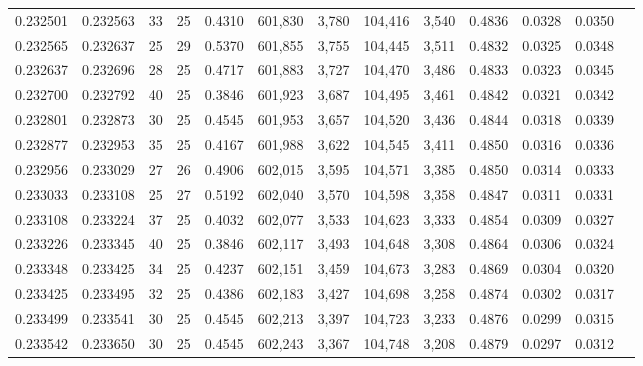 \begin{tabular}{rrrrrrrrrrrrr}
0.232501 & 0.232563 &  33 &  25 &                                     0.4310 & 601,830 &   3,780 & 104,416 &   3,540 & 0.4836 & 0.0328 & 0.0350 \\
0.232565 & 0.232637 &  25 &  29 &                                     0.5370 & 601,855 &   3,755 & 104,445 &   3,511 & 0.4832 & 0.0325 & 0.0348 \\
0.232637 & 0.232696 &  28 &  25 &                                     0.4717 & 601,883 &   3,727 & 104,470 &   3,486 & 0.4833 & 0.0323 & 0.0345 \\
0.232700 & 0.232792 &  40 &  25 &                                     0.3846 & 601,923 &   3,687 & 104,495 &   3,461 & 0.4842 & 0.0321 & 0.0342 \\
0.232801 & 0.232873 &  30 &  25 &                                     0.4545 & 601,953 &   3,657 & 104,520 &   3,436 & 0.4844 & 0.0318 & 0.0339 \\
0.232877 & 0.232953 &  35 &  25 &                                     0.4167 & 601,988 &   3,622 & 104,545 &   3,411 & 0.4850 & 0.0316 & 0.0336 \\
0.232956 & 0.233029 &  27 &  26 &                                     0.4906 & 602,015 &   3,595 & 104,571 &   3,385 & 0.4850 & 0.0314 & 0.0333 \\
0.233033 & 0.233108 &  25 &  27 &                                     0.5192 & 602,040 &   3,570 & 104,598 &   3,358 & 0.4847 & 0.0311 & 0.0331 \\
0.233108 & 0.233224 &  37 &  25 &                                     0.4032 & 602,077 &   3,533 & 104,623 &   3,333 & 0.4854 & 0.0309 & 0.0327 \\
0.233226 & 0.233345 &  40 &  25 &                                     0.3846 & 602,117 &   3,493 & 104,648 &   3,308 & 0.4864 & 0.0306 & 0.0324 \\
0.233348 & 0.233425 &  34 &  25 &                                     0.4237 & 602,151 &   3,459 & 104,673 &   3,283 & 0.4869 & 0.0304 & 0.0320 \\
0.233425 & 0.233495 &  32 &  25 &                                     0.4386 & 602,183 &   3,427 & 104,698 &   3,258 & 0.4874 & 0.0302 & 0.0317 \\
0.233499 & 0.233541 &  30 &  25 &                                     0.4545 & 602,213 &   3,397 & 104,723 &   3,233 & 0.4876 & 0.0299 & 0.0315 \\
0.233542 & 0.233650 &  30 &  25 &                                     0.4545 & 602,243 &   3,367 & 104,748 &   3,208 & 0.4879 & 0.0297 & 0.0312 \\

\end{tabular}
